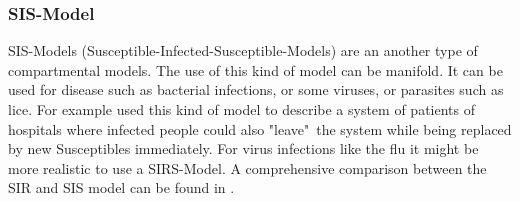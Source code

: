\subsubsection{SIS-Model}
SIS-Models (Susceptible-Infected-Susceptible-Models) are an another type of compartmental models. The use of this kind of model can be manifold. It can be used for disease such as bacterial infections, or some viruses, or parasites such as lice. For example \citep{BEL16} used this kind of model to describe a system of patients of hospitals where infected people could also "leave"\ the system while being replaced by new Susceptibles immediately. For virus infections like the flu it might be more realistic to use a SIRS-Model. A comprehensive comparison between the SIR and SIS model can be found in \citep{jacquez1993stochastic}.